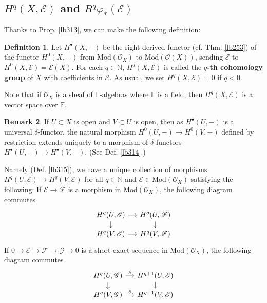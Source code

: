 \documentclass[12pt,b5paper,notitlepage]{report}
\theoremstyle{definition}
\newtheorem{df}{Definition}[section]
\newtheorem{rem}[df]{Remark}
\theoremstyle{plain}
\newcommand{\scr}{\mathscr}
\newcommand{\blt}{\bullet}
\newcommand{\Nbb}{\mathbb N}
\newcommand{\Mod}{\mathrm{Mod}}
\newcommand{\Fbb}{\mathbb F}
\numberwithin{equation}{section}
\begin{document}
\subsection{$H^q(X,\scr E)$ and $R^q\varphi_*(\scr E)$}


Thanks to Prop. \ref{lb313}, we can make the following definition:

\begin{df}
Let $H^\blt(X,-)$ be the right derived functor (cf. Thm. \ref{lb253}) of the functor $H^0(X,-)$ from $\Mod(\scr O_X)$ to $\Mod(\scr O(X))$, sending $\scr E$ to $H^0(X,\scr E)=\scr E(X)$. For each $q\in\Nbb$, $H^q(X,\scr E)$ \index{Hq@$H^q(X,\scr E)$, sheaf cohomology} is called the \textbf{$q$-th cohomology group}  of $X$ with coefficients in $\scr E$. As usual, we set $H^q(X,\scr E)=0$ if $q<0$.

Note that if $\scr O_X$ is a sheaf of $\Fbb$-algebras where $\Fbb$ is a field, then $H^q(X,\scr E)$ is a vector space over $\Fbb$.   \hfill\qedsymbol
\end{df}


\begin{rem}\label{lb316}
If $U\subset X$ is open and $V\subset U$ is open, then as $H^\blt(U,-)$ is a universal $\delta$-functor, the natural morphism $H^0(U,-)\rightarrow H^0(V,-)$ defined by restriction extends uniquely to a morphism of $\delta$-functors $H^\blt(U,-)\rightarrow H^\blt(V,-)$. (See Def. \ref{lb314}.) 

Namely (Def. \ref{lb315}), we have a unique collection of morphisms $H^q(U,\scr E)\rightarrow H^q(V,\scr E)$ for all $q\in\Nbb$ and $\scr E\in\Mod(\scr O_X)$ satisfying the following: If $\scr E\rightarrow\scr F$ is a morphism in $\Mod(\scr O_X)$, the following diagram commutes
\begin{equation}
\begin{tikzcd}[sep=small]
H^q(U,\scr E) \arrow[r] \arrow[d] & H^q(U,\scr F) \arrow[d] \\
H^q(V,\scr E)\arrow[r]           & H^q(V,\scr F)         
\end{tikzcd}
\end{equation}
If $0\rightarrow\scr E\rightarrow\scr F\rightarrow\scr G\rightarrow0$ is a short exact sequence in $\Mod(\scr O_X)$, the following diagram commutes
\begin{equation}
\begin{tikzcd}[sep=small]
H^q(U,\scr G) \arrow[r,"\delta"] \arrow[d] & H^{q+1}(U,\scr E) \arrow[d] \\
H^q(V,\scr G)\arrow[r,"\delta"]           & H^{q+1}(V,\scr E)         
\end{tikzcd}
\end{equation}
\hfill\qedsymbol
\end{rem}
\end{document}
